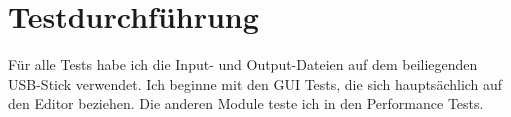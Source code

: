 \section{Testdurchführung}
Für alle Tests habe ich die Input- und Output-Dateien auf dem beiliegenden USB-Stick verwendet. Ich beginne mit den GUI Tests, die sich hauptsächlich auf den Editor beziehen. Die anderen Module teste ich in den Performance Tests. 



